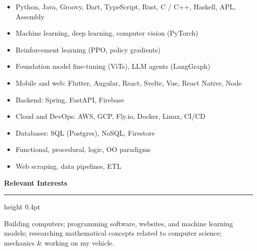 \documentclass[11pt,a4paper]{article}
\newcommand{\edsection}[1]{%
  \par\vspace{6pt}%
  \textbf{#1}\par
  \vspace{0pt}\hrule height 0.4pt\vspace{2pt}%
}
\begin{document}
\begin{itemize}
\item Python, Java, Groovy, Dart, TypeScript, Rust, C / C++, Haskell, APL, Assembly
\item Machine learning, deep learning, computer vision (PyTorch)
\item Reinforcement learning (PPO, policy gradients)
\item Foundation model fine-tuning (ViTs), LLM agents (LangGraph)
\item Mobile and web: Flutter, Angular, React, Svelte, Vue, React Native, Node
\item Backend: Spring, FastAPI, Firebase
\item Cloud and DevOps: AWS, GCP, Fly.io, Docker, Linux, CI/CD
\item Databases: SQL (Postgres), NoSQL, Firestore
\item Functional, procedural, logic, OO paradigms
\item Web scraping, data pipelines, ETL
\end{itemize}

\edsection{Relevant Interests}

Building computers; programming software, websites, and machine learning models; researching mathematical concepts related to computer science; mechanics \& working on my vehicle.
\end{document}
